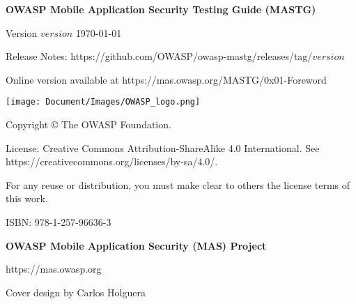\thispagestyle{empty} %

\textbf{OWASP Mobile Application Security Testing Guide (MASTG)}

Version $version$ \today

Release Notes: https://github.com/OWASP/owasp-mastg/releases/tag/$version$

Online version available at https://mas.owasp.org/MASTG/0x01-Foreword

\texttt{[image: Document/Images/OWASP\_logo.png]}

Copyright © The OWASP Foundation. 

License: Creative Commons Attribution-ShareAlike 4.0 International. See https://creativecommons.org/licenses/by-sa/4.0/.

For any reuse or distribution, you must make clear to others the license terms of this work.

ISBN: 978-1-257-96636-3 


\textbf{OWASP Mobile Application Security (MAS) Project}

https://mas.owasp.org


Cover design by Carlos Holguera